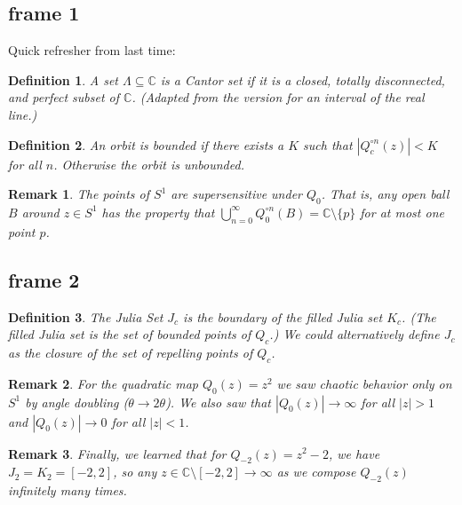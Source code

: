 \documentclass[xcolor=x11names,compress]{beamer}
\renewcommand{\(}{\begin{columns}}
\renewcommand{\)}{\end{columns}}
\newcommand{\<}[1]{\begin{column}{#1}}
\renewcommand{\>}{\end{column}}
\newtheorem{defn}{Definition}
\newtheorem{rmk}{Remark}
\begin{document}
\subsection{frame 1}
\begin{frame}

Quick refresher from last time:

\pause

\begin{defn}
A set $\Lambda \subseteq \mathbb{C}$ is a Cantor set if it is a closed, totally disconnected, and perfect subset of $\mathbb{C}$. (Adapted from the version for an interval of the real line.)
\end{defn}


\pause

\begin{defn}
An orbit is \textsl{bounded} if there exists a $K$ such that $|Q_c^{\circ n}(z)| < K$ for all $n$. Otherwise the orbit is \textsl{unbounded}.
\end{defn}

\pause

\begin{rmk}
The points of $S^1$ are \textsl{supersensitive} under $Q_{0}$. That is, any open ball $B$ around $z \in S^1$ has the property that $\bigcup_{n=0}^\infty Q_0^{\circ n} (B) = \mathbb{C} \setminus \{p\}$ for at most one point $p$.
\end{rmk}

\end{frame}


\subsection{frame 2}
\begin{frame}

\begin{defn}
The Julia Set $J_c$ is the boundary of the filled Julia set $K_c$. (The filled Julia set is the set of bounded points of $Q_c$.) We could alternatively define $J_c$ as the closure of the set of repelling points of $Q_c$.
\end{defn}

\pause


\begin{rmk}
For the quadratic map $Q_0(z) = z^2$ we saw chaotic behavior only on $S^1$ by angle doubling ($\theta \rightarrow 2\theta$). We also saw that $|Q_0(z)| \rightarrow \infty$ for all $|z| > 1$ and $|Q_0(z)| \rightarrow 0$ for all $|z| < 1$.
\end{rmk}

\pause


\begin{rmk}
Finally, we learned that for $Q_{-2}(z) = z^2 - 2$, we have $J_2 = K_2 = [-2, 2]$, so any $z \in \mathbb{C} \setminus [-2,2] \rightarrow \infty$ as we compose $Q_{-2}(z)$ infinitely many times. 
\end{rmk}

\end{frame}
\end{document}
